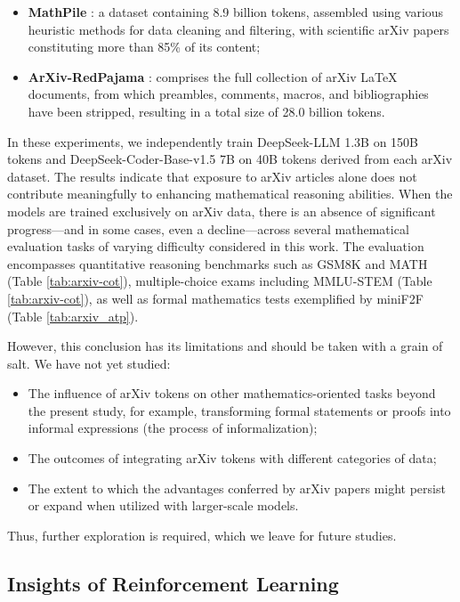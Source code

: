 \begin{itemize}[topsep=0pt]
\begin{itemize}[topsep=0pt]
\begin{itemize}[topsep=0pt]
    \item \textbf{MathPile} \citep{mathpile}: a dataset containing 8.9 billion tokens, assembled using various heuristic methods for data cleaning and filtering, with scientific arXiv papers constituting more than 85\% of its content;
    \item \textbf{ArXiv-RedPajama} \citep{redpajama}: comprises the full collection of arXiv LaTeX documents, from which preambles, comments, macros, and bibliographies have been stripped, resulting in a total size of 28.0 billion tokens.
\end{itemize}

In these experiments, we independently train DeepSeek-LLM 1.3B on 150B tokens and DeepSeek-Coder-Base-v1.5 7B on 40B tokens derived from each arXiv dataset. The results indicate that exposure to arXiv articles alone does not contribute meaningfully to enhancing mathematical reasoning abilities. When the models are trained exclusively on arXiv data, there is an absence of significant progress—and in some cases, even a decline—across several mathematical evaluation tasks of varying difficulty considered in this work. The evaluation encompasses quantitative reasoning benchmarks such as GSM8K and MATH (Table \ref{tab:arxiv-cot}), multiple-choice exams including MMLU-STEM (Table \ref{tab:arxiv-cot}), as well as formal mathematics tests exemplified by miniF2F (Table \ref{tab:arxiv_atp}).

However, this conclusion has its limitations and should be taken with a grain of salt. We have not yet studied:

\begin{itemize}[topsep=0pt]
    \item The influence of arXiv tokens on other mathematics-oriented tasks beyond the present study, for example, transforming formal statements or proofs into informal expressions (the process of informalization);
    \item The outcomes of integrating arXiv tokens with different categories of data;
    \item The extent to which the advantages conferred by arXiv papers might persist or expand when utilized with larger-scale models.
\end{itemize}

Thus, further exploration is required, which we leave for future studies.

\subsection{Insights of Reinforcement Learning}

\end{itemize}
\end{itemize}

